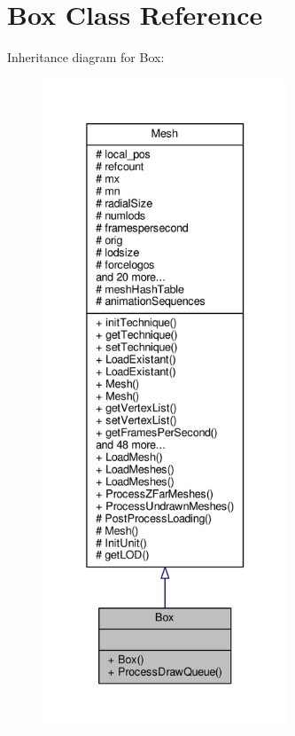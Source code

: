 \hypertarget{classBox}{}\section{Box Class Reference}
\label{classBox}


Inheritance diagram for Box\+:
\nopagebreak
\begin{figure}[H]
\begin{center}
\leavevmode
\includegraphics[height=550pt]{d4/df1/classBox__inherit__graph}
\end{center}
\end{figure}



